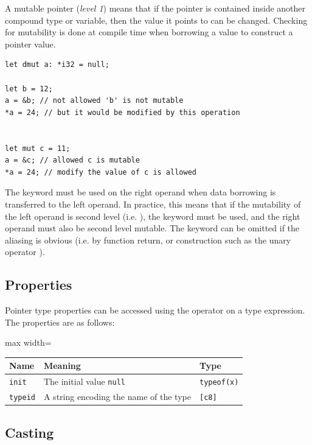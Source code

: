 A mutable pointer (\textit{level 1}) means that if the pointer is contained
inside another compound type or variable, then the value it points to can be
changed. Checking for mutability is done at compile time when borrowing a value
to construct a pointer value.
\smallskip

\begin{lstlisting}[style=coloredverbatimError]
let dmut a: *i32 = null;

let b = 12;
a = &b; // not allowed 'b' is not mutable
*a = 24; // but it would be modified by this operation


let mut c = 11;
a = &c; // allowed c is mutable
*a = 24; // modify the value of c is allowed
\end{lstlisting}

\smallskip
The keyword  must be used on the right operand when data borrowing
is transferred to the left operand. In practice, this means that if the
mutability of the left operand is second level (i.e. ), the
keyword  must be used, and the right operand must also be second
level mutable. The keyword can be omitted if the aliasing is obvious (i.e. by
function return, or construction such as the unary operator \token{\&}).

\subsection {Properties}

Pointer type properties can be accessed using the \token{::} operator on a type
expression. The properties are as follows:

\begin{center}\begin{adjustbox}{max width=\linewidth}
  \begin{tabular}{|l|ll|}
    \hline
    Name & Meaning & Type\\
    \hline
    \hline
    \texttt{init} & The initial value \texttt{null} & \texttt{typeof(x)}\\
    \hline
    \texttt{typeid} & A string encoding the name of the type & \texttt{[c8]} \\
    \hline
  \end{tabular}
\end{adjustbox}\end{center}

\subsection {Casting}

